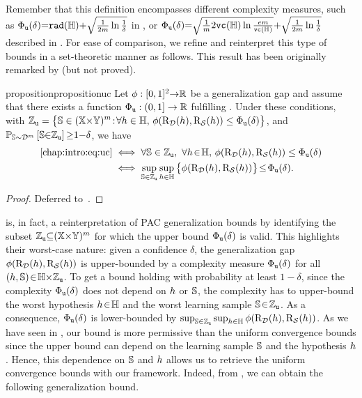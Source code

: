 
Remember that this definition encompasses different complexity measures, such as $\PhiUC(\delta){=}\rad(\H) {+} \sqrt{\tfrac{1}{2\m}\ln\frac{1}{\delta}}$ in , or $\PhiUC(\delta){=}\sqrt{\frac{1}{m}2\vc(\H)\ln\frac{em}{\vc(\H)}}{+}\sqrt{\tfrac{1}{2\m}\ln\frac{1}{\delta}}$ described in .
For ease of comparison, we refine and reinterpret this type of bounds in a set-theoretic manner as follows.
This result has been originally remarked by \citet{NagarajanKolter2019} (but not proved).

\begin{restatable}{proposition}{propositionuc}\label{chap:dis-mu:proposition:uc}
Let $\phi: [0,1]^2{\to}\Rbb$ be a generalization gap and assume that there exists a function $\PhiUC: (0,1]\to\Rbb$ fulfilling .
Under these conditions, with $\displaystyle\setUC = \big\{ \S\in (\X{\times}\Y)^\m \!:\! \forall \h\in\H,\, \phi(\Risk_{\D}(\h), \Risk_{\dS}(\h)) \le \PhiUC(\delta) \big\}$, and $\PP_{\S\sim\D^\m}\LB \S{\in}\setUC \RB{\ge}  1{-}\delta$, we have
\begin{align*}
    \text{\Cref{chap:intro:eq:uc}} &\iff \forall \S \in \setUC,\   \forall h\!\in\! \H,\, \phi(\Risk_{\D}(\h), \Risk_{\dS}(\h)) \le \PhiUC(\delta)\\
    &\iff \sup_{\S\in\setUC}\sup_{h\in\H}\big\{\phi(\Risk_{\D}(\h), \Risk_{\dS}(\h))\big\}\! \le\! \PhiUC(\delta).
\end{align*}
\end{restatable}
\begin{noaddcontents}\begin{proof}
Deferred to~.
\end{proof}\end{noaddcontents}

 is, in fact, a reinterpretation of PAC generalization bounds by identifying the subset $\setUC {\subseteq} (\X{\times}\Y)^\m$ for which the upper bound $\PhiUC(\delta)$ is valid.
This highlights their worst-case nature:
given a confidence $\delta$, the generalization gap $\phi(\Risk_{\D}(\h), \Risk_{\dS}(\h))$ is upper-bounded by a complexity measure $\PhiUC(\delta)$ for all $(\h,\S)\!\in\!\H{\times}\setUC$.
To get a bound holding with probability at least $1{-}\delta$, 
since the complexity $\PhiUC(\delta)$ does not depend on $\h$ or $\S$, the complexity has to upper-bound the worst hypothesis $\h\!\in\!\H$ and the worst learning sample $\S\!\in\!\setUC$. 
As a consequence, $\PhiUC(\delta)$ is lower-bounded by $\sup_{\S\in\setUC}\sup_{h\in\H}\phi(\Risk_{\D}(\h), \Risk_{\dS}(\h))$.
As we have seen in , our bound is more permissive than the uniform convergence bounds since the upper bound can depend on the learning sample $\S$ and the hypothesis $\h$.
Hence, this dependence on $\S$ and $\h$ allows us to retrieve the uniform convergence bounds with our framework.
Indeed, from , we can obtain the following generalization bound.

